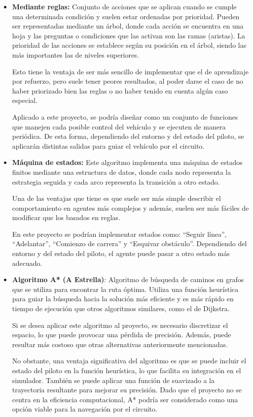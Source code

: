 \begin{itemize}
   \item \textbf{Mediante reglas:} Conjunto de acciones que se aplican cuando se cumple una determinada condición y suelen estar ordenadas por prioridad. Pueden ser representadas mediante un árbol, donde cada acción se encuentra en una hoja y las preguntas o condiciones que las activan son las ramas (aristas). La prioridad de las acciones se establece según su posición en el árbol, siendo las más importantes las de niveles superiores.
   
   Esto tiene la ventaja de ser más sencillo de implementar que el de aprendizaje por refuerzo, pero suele tener peores resultados, al poder darse el caso de no haber priorizado bien las reglas o no haber tenido en cuenta algún caso especial.


   Aplicado a este proyecto, se podría diseñar como un conjunto de funciones que manejen cada posible control del vehículo y se ejecuten de manera periódica. De esta forma, dependiendo del entorno y del estado del piloto, se aplicarán distintas salidas para guiar el vehículo por el circuito.

   \item \textbf{Máquina de estados:} Este algoritmo implementa una máquina de estados finitos mediante una estructura de datos, donde cada nodo representa la estrategia seguida y cada arco representa la transición a otro estado. 
   
   Una de las ventajas que tiene es que suele ser más simple describir el comportamiento en agentes más complejos y además, suelen ser más fáciles de modificar que los basados en reglas.

   En este proyecto se podrían implementar estados como: ``Seguir línea'', ``Adelantar'', ``Comienzo de carrera'' y ``Esquivar obstáculo''. Dependiendo del entorno y del estado del piloto, el agente puede pasar a otro estado más adecuado.

   \item \textbf{Algoritmo A* (A Estrella)}: Algoritmo de búsqueda de caminos en grafos que se utiliza para encontrar la ruta óptima. Utiliza una función heurística para guiar la búsqueda hacia la solución más eficiente y es más rápido en tiempo de ejecución que otros algoritmos similares, como el de Dijkstra.
   
   Si se desea aplicar este algoritmo al proyecto, es necesario discretizar el espacio, lo que puede provocar una pérdida de precisión. Además, puede resultar más costoso que otras alternativas anteriormente mencionadas.

   No obstante, una ventaja significativa del algoritmo es que se puede incluir el estado del piloto en la función heurística, lo que facilita su integración en el simulador. También se puede aplicar una función de suavizado a la trayectoria resultante para mejorar su precisión. Dado que el proyecto no se centra en la eficiencia computacional, A* podría ser considerado como una opción viable para la navegación por el circuito.
\end{itemize}